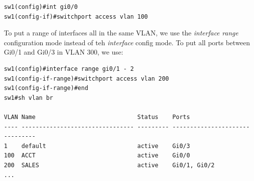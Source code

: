 \vspace{-15pt}
\begin{verbatim}
sw1(config)#int gi0/0
sw1(config-if)#switchport access vlan 100
\end{verbatim}
\vspace{-10pt}

\noindent
To put a range of interfaces all in the same VLAN, we use the \textit{interface range} configuration mode instead of teh \textit{interface} config mode. To put all ports between Gi0/1 and Gi0/3 in VLAN 300, we use: 

\vspace{-15pt}
\begin{verbatim}
sw1(config)#interface range gi0/1 - 2
sw1(config-if-range)#switchport access vlan 200
sw1(config-if-range)#end
sw1#sh vlan br

VLAN Name                             Status    Ports
---- -------------------------------- --------- -------------------------------
1    default                          active    Gi0/3
100  ACCT                             active    Gi0/0
200  SALES                            active    Gi0/1, Gi0/2
...
\end{verbatim}
\vspace{-10pt}
